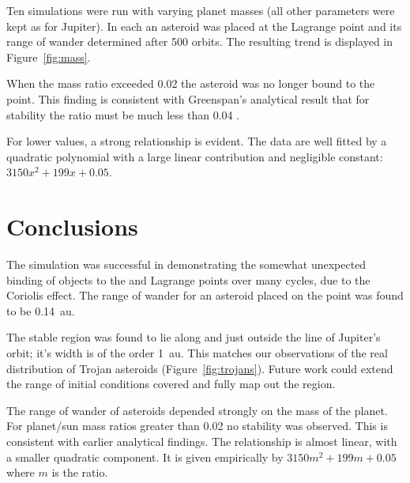 \documentclass[a4paper]{article}
\begin{document}
      Ten simulations were run with varying planet masses (all other parameters
      were kept as for Jupiter). In each an asteroid was placed at the Lagrange
      point and its range of wander determined after 500 orbits. The resulting
      trend is displayed in Figure~\ref{fig:mass}.

      When the mass ratio exceeded 0.02 the asteroid was no longer bound to the
      point. This finding is consistent with Greenspan's analytical result that
      for stability the ratio must be much less than 0.04 \cite{greenspan}. 

      For lower values, a strong relationship is evident. The data are well
      fitted by a quadratic polynomial with a large linear contribution and
      negligible constant: $3150 x^2 + 199 x + 0.05$.

  \section{Conclusions}

    The simulation was successful in demonstrating the somewhat unexpected
    binding of objects to the  and  Lagrange points over many
    cycles, due to the Coriolis effect. The range of wander for an asteroid
    placed on the point was found to be \SI{0.14}{\astronomicalunit}.
    
    The stable region was found to lie along and just outside the line of
    Jupiter's orbit; it's width is of the order \SI{1}{\astronomicalunit}.
    This matches our observations of the real distribution of Trojan asteroids
    (Figure~\ref{fig:trojans}). Future work could extend the range of initial
    conditions covered and fully map out the region.

    The range of wander of asteroids depended strongly on the mass of the
    planet. For planet/sun mass ratios greater than 0.02 no stability was
    observed. This is consistent with earlier analytical findings. The
    relationship is almost linear, with a smaller quadratic component. It is
    given empirically by $3150 m^2 + 199 m + 0.05$ where $m$ is the ratio.
\end{document}
